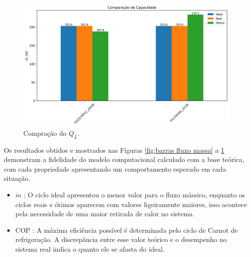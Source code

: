 \begin{figure}[h]
    \centering
    \includegraphics[width=0.8\linewidth]{Imagens/Desenvolvimento/barras_QL.png}
    \caption{Compração do $Q_L$.}
    \label{fig:barras Ql}
\end{figure}



Os resultados obtidos e mostrados nas Figuras \ref{fig:barras fluxo massa} a \ref{fig:barras Ql} demonstram a fidelidade do modelo computacional calculado com a base teórica, com  cada propriedade apresentando um comportamento esperado em cada situação.

    \begin{itemize}
        \item $\dot{m}$ : O ciclo ideal apresentou o menor valor para o fluxo mássico, enquanto os ciclos reais e ótimos aparecem com valores ligeiramente maiores, isso acontece pela necessidade de uma maior retirada de calor no sistema.
        \item COP : A máxima eficiência possível é determinada pelo ciclo de Carnot de refrigeração. A discrepância entre esse valor teórico e o desempenho no sistema real indica o quanto ele se afasta do ideal.
    \end{itemize}

